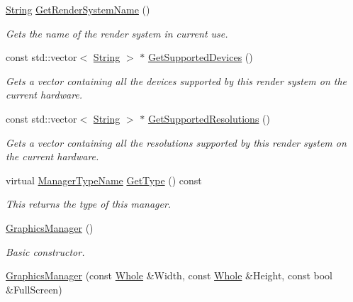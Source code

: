 \begin{DoxyCompactItemize}
\hyperlink{namespaceMezzanine_acf9fcc130e6ebf08e3d8491aebcf1c86}{String} \hyperlink{classMezzanine_1_1GraphicsManager_af3ed012f12d5eac824cde585c982792f}{GetRenderSystemName} ()
\begin{DoxyCompactList}\small\item\em Gets the name of the render system in current use. \item\end{DoxyCompactList}\item 
const std::vector$<$ \hyperlink{namespaceMezzanine_acf9fcc130e6ebf08e3d8491aebcf1c86}{String} $>$ $\ast$ \hyperlink{classMezzanine_1_1GraphicsManager_a0cff2e9eaa6164de34c0fb1042f65014}{GetSupportedDevices} ()
\begin{DoxyCompactList}\small\item\em Gets a vector containing all the devices supported by this render system on the current hardware. \item\end{DoxyCompactList}\item 
const std::vector$<$ \hyperlink{namespaceMezzanine_acf9fcc130e6ebf08e3d8491aebcf1c86}{String} $>$ $\ast$ \hyperlink{classMezzanine_1_1GraphicsManager_a88383aa6cdfe9bd8aec1bc4955568388}{GetSupportedResolutions} ()
\begin{DoxyCompactList}\small\item\em Gets a vector containing all the resolutions supported by this render system on the current hardware. \item\end{DoxyCompactList}\item 
virtual \hyperlink{classMezzanine_1_1ManagerBase_a08cecf5169cad3e82be81a3a159b0b6e}{ManagerTypeName} \hyperlink{classMezzanine_1_1GraphicsManager_a4a036b7a4623e9f568310a90d5e34e46}{GetType} () const 
\begin{DoxyCompactList}\small\item\em This returns the type of this manager. \item\end{DoxyCompactList}\item 
\hyperlink{classMezzanine_1_1GraphicsManager_ab7637d879d3180218dc2d04744b19991}{GraphicsManager} ()
\begin{DoxyCompactList}\small\item\em Basic constructor. \item\end{DoxyCompactList}\item 
\hyperlink{classMezzanine_1_1GraphicsManager_a66b3bd12fa240451893755008dc4d045}{GraphicsManager} (const \hyperlink{namespaceMezzanine_adcbb6ce6d1eb4379d109e51171e2e493}{Whole} \&Width, const \hyperlink{namespaceMezzanine_adcbb6ce6d1eb4379d109e51171e2e493}{Whole} \&Height, const bool \&FullScreen)

\end{DoxyCompactItemize}

